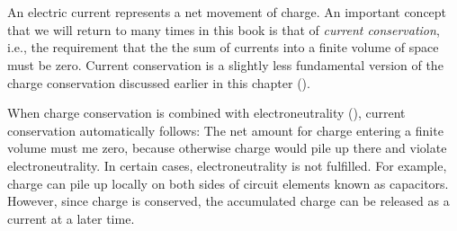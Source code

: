 \section{}
\label{sec:Basics:Current} 
An electric current represents a net movement of charge. An important concept that we will return to many times in this book is that of {\it current conservation}, i.e., the requirement that the the sum of currents into a finite volume of space must be zero. Current conservation is a slightly less fundamental version of the charge conservation discussed earlier in this chapter (). 

When charge conservation is combined with electroneutrality (), current conservation automatically follows: The net amount for charge entering a finite volume must me zero, because otherwise charge would pile up there and violate electroneutrality. In certain cases, electroneutrality is not fulfilled. 
For example, charge can pile up locally on both sides of circuit elements known as capacitors. However, since charge is conserved, the accumulated charge can be released as a current at a later time. 

